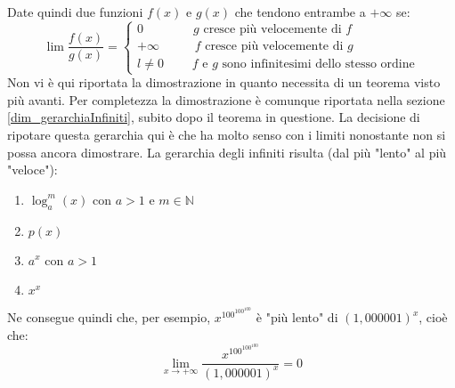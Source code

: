 Date quindi due funzioni $f(x)$ e $g(x)$ che tendono entrambe a $+ \infty$ se:
\begin{equation*}
    \lim \dfrac{f(x)}{g(x)} =
    \begin{cases*}
        0 \qquad \qquad g \text{ cresce più velocemente di } f\\
        +\infty \qquad \;\;\; f \text{ cresce più velocemente di } g\\
        l \neq 0 \qquad \; \text{$f$ e $g$ sono infinitesimi dello stesso ordine}
    \end{cases*}
\end{equation*}
Non vi è qui riportata la dimostrazione in quanto necessita di un teorema visto più avanti. Per completezza la dimostrazione è comunque riportata nella sezione \ref{dim_gerarchiaInfiniti}, subito dopo il teorema in questione. La decisione di ripotare questa gerarchia qui è che ha molto senso con i limiti nonostante non si possa ancora dimostrare. La gerarchia degli infiniti risulta (dal più "lento" al più "veloce"):
\begin{enumerate}
	\item $\log_a^m (x)$ con $a > 1$ e $m \in \mathbb{N}$
	\item $p(x)$
	\item $a^x$ con $a > 1$
	\item $x^x$
\end{enumerate}
Ne consegue quindi che, per esempio, $x^{100^{100^{100}}}$ è "più lento" di $(1,000001)^x$, cioè che:
\begin{equation*}
    \lim_{x \to + \infty} \dfrac{x^{100^{100^{100}}}}{(1,000001)^x} = 0
\end{equation*}

